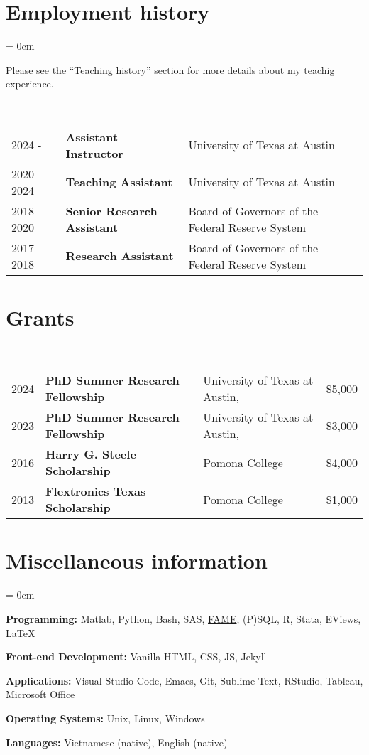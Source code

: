 \documentclass[a4paper, 10pt]{article}
\begin{document}
  \section{Employment history}
  \begin{compactitem}\parskip = 0cm
    \item Please see the {\hypersetup{linkcolor = black}\hyperref[sec:teaching_history]{``Teaching history''}} section for more details about my teachig experience.
  \end{compactitem}
  \vspace*{0.70em}
  ~\begin{tabular}{lll}
    2024 - & \textbf{Assistant Instructor} & University of Texas at Austin\\
    2020 - 2024 & \textbf{Teaching Assistant} & University of Texas at Austin\\
    2018 - 2020 & \textbf{Senior Research Assistant} & Board of Governors of the Federal Reserve System\\
    2017 - 2018 & \textbf{Research Assistant} & Board of Governors of the Federal Reserve System
  \end{tabular}
  \vspace*{0.25em}
      
  \section{Grants}
  ~\begin{tabular}{llll}
    2024 & \textbf{PhD Summer Research Fellowship} & University of Texas at Austin, & \$5,000\\
    2023 & \textbf{PhD Summer Research Fellowship} & University of Texas at Austin, & \$3,000\\
    2016 & \textbf{Harry G. Steele Scholarship} & Pomona College & \$4,000\\
    2013 & \textbf{Flextronics Texas Scholarship} & Pomona College & \$1,000
  \end{tabular}
  \vspace*{0.25em}
    
  \section{Miscellaneous information}
  \begin{compactitem}\parskip = 0cm
    \item \textbf{Programming:} Matlab, Python, Bash, SAS, \href{https://en.wikipedia.org/wiki/FAME_(database)}{FAME}, (P)SQL, R, Stata, EViews, \LaTeX
    \item \textbf{Front-end Development:} Vanilla HTML, CSS, JS, Jekyll
    \item \textbf{Applications:} Visual Studio Code, Emacs, Git, Sublime Text, RStudio, Tableau, Microsoft Office
    \item \textbf{Operating Systems:} Unix, Linux, Windows
    \item \textbf{Languages:} Vietnamese (native), English (native)
  \end{compactitem}
\end{document}
